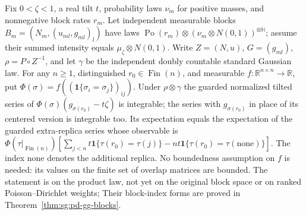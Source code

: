 \begin{lemma}\label{lem:sg:pd-marked-transfer}
  \leanok
  Fix $0<\zeta<1$, a real tilt $t$, probability laws $\nu_m$ for positive
  masses, and nonnegative block rates $r_m$. Let independent measurable
  blocks $B_m=(N_m,(u_{ml},g_{ml})_l)$ have laws
  $\operatorname{Po}(r_m)\otimes(\nu_m\otimes N(0,1))^{\otimes\mathbb N}$;
  assume their summed intensity equals $\mu_\zeta\otimes N(0,1)$.
  Write $Z=(N,u)$, $G=(g_{ml})$, $\rho=P\circ Z^{-1}$, and let $\gamma$
  be the independent doubly countable standard Gaussian law. For any
  $n\ge1$, distinguished $r_0\in\operatorname{Fin}(n)$, and measurable
  $f:\mathbb R^{n\times n}\to\mathbb R$, put
  $\Phi(\sigma)=f((\mathbf 1\{\sigma_i=\sigma_j\})_{ij})$.
  Under $\rho\otimes\gamma$ the guarded normalized tilted series of
  $\Phi(\sigma)(g_{\sigma(r_0)}-t\zeta)$ is integrable; the series with
  $g_{\sigma(r_0)}$ in place of its centered version is integrable too.
  Its expectation equals the expectation of the guarded extra-replica
  series whose observable is
  $\Phi(\tau|_{\operatorname{Fin}(n)})
    [\sum_{j<n}t\mathbf1\{\tau(r_0)=\tau(j)\}
       -nt\mathbf1\{\tau(r_0)=\tau(\mathrm{none})\}]$.
  The index $\mathrm{none}$ denotes the additional replica. No boundedness
  assumption on $f$ is needed: its values on the finite set of overlap
  matrices are bounded. The statement is on the product law, not yet on
  the original block space or on ranked Poisson--Dirichlet weights;
  Their block-index forms are proved in Theorem~\ref{thm:sg:pd-gg-blocks}.
\end{lemma}

